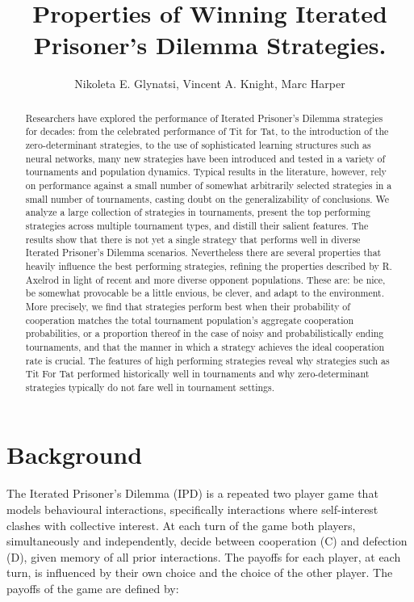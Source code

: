 \documentclass{article}
\title{Properties of Winning Iterated Prisoner's Dilemma Strategies.}
\author{Nikoleta E. Glynatsi, Vincent A. Knight, Marc Harper}
\date{}
\newcommand{\numberofalltournaments}{}
\newcommand{\numberofstrategies}{}
\begin{document}
\maketitle

\begin{abstract}
Researchers have explored the performance of Iterated Prisoner's Dilemma strategies
for decades: from the celebrated performance of Tit for Tat, to the
introduction of the zero-determinant strategies, to the use of sophisticated learning
structures such as neural networks, many new strategies have been introduced and tested
in a variety of tournaments and population dynamics. Typical results in the literature,
however, rely on performance against a small number of somewhat arbitrarily selected
strategies in a small number of tournaments, casting doubt on the generalizability
of conclusions. We analyze a large collection of \numberofstrategies
strategies in \numberofalltournaments tournaments, present the top performing strategies across multiple
tournament types, and distill their salient features. The results show that there is not yet a single
strategy that performs well in diverse Iterated Prisoner's Dilemma scenarios.
Nevertheless there are several properties that heavily influence the best performing
strategies, refining the properties described by R. Axelrod in light of
recent and more diverse opponent populations. These are: be nice, be somewhat provocable
be a little envious, be clever, and adapt to the environment. More precisely,
we find that strategies perform best when their probability of cooperation
matches the total tournament population's aggregate cooperation probabilities,
or a proportion thereof in the case of noisy and probabilistically ending tournaments,
and that the manner in which a strategy achieves the ideal cooperation rate is crucial.
The features of high performing strategies reveal why strategies such as Tit For Tat
performed historically well in tournaments and why zero-determinant strategies
typically do not fare well in tournament settings.
\end{abstract}

\section{Background}

The Iterated Prisoner's Dilemma (IPD) is a repeated two player game that models
behavioural interactions, specifically interactions where
self-interest clashes with collective interest. At each turn of the game both
players, simultaneously and independently, decide between cooperation (C) and
defection (D), given memory of all prior interactions. The payoffs for each
player, at each turn, is influenced by their own choice and the choice of the
other player. The payoffs of the game are defined by:
\end{document}

